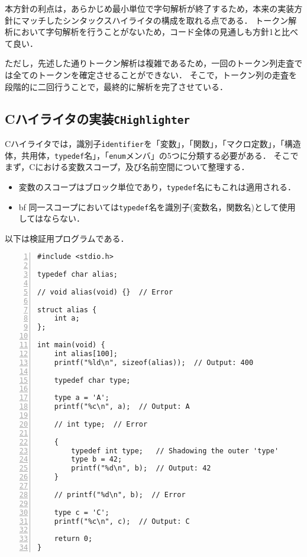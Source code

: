 \documentclass[autodetect-engine,dvi=dvipdfmx,ja=standard,
               a4j,11pt]{bxjsarticle}
\begin{document}
本方針の利点は，あらかじめ最小単位で字句解析が終了するため，本来の実装方針にマッチしたシンタックスハイライタの構成を取れる点である．
トークン解析において字句解析を行うことがないため，コード全体の見通しも方針1と比べて良い．

ただし，先述した通りトークン解析は複雑であるため，一回のトークン列走査では全てのトークンを確定させることができない．
そこで，トークン列の走査を段階的に二回行うことで，最終的に解析を完了させている．

\subsection{Cハイライタの実装{\tt CHighlighter}}

Cハイライタでは，識別子\verb|identifier|を「変数」，「関数」，「マクロ定数」，「構造体，共用体，\verb|typedef|名」，「\verb|enum|メンバ」の5つに分類する必要がある．
そこでまず，Cにおける変数スコープ，及び名前空間について整理する．

\begin{itemize}
    \item 変数のスコープはブロック単位であり，\verb|typedef|名にもこれは適用される．
    \item {bf 同一スコープにおいては}\verb|typedef|名を識別子(変数名，関数名)として使用してはならない．
\end{itemize}
%
以下は検証用プログラムである．

\begin{Verbatim}[numbers=left, xleftmargin=8mm, numbersep=6pt, fontsize=\small, baselinestretch=0.8]
#include <stdio.h>

typedef char alias;

// void alias(void) {}  // Error

struct alias {
    int a;
};

int main(void) {
    int alias[100];
    printf("%ld\n", sizeof(alias));  // Output: 400

    typedef char type;

    type a = 'A';
    printf("%c\n", a);  // Output: A

    // int type;  // Error

    {
        typedef int type;   // Shadowing the outer 'type'
        type b = 42;
        printf("%d\n", b);  // Output: 42
    }

    // printf("%d\n", b);  // Error

    type c = 'C';
    printf("%c\n", c);  // Output: C

    return 0;
}
\end{Verbatim}
\end{document}
